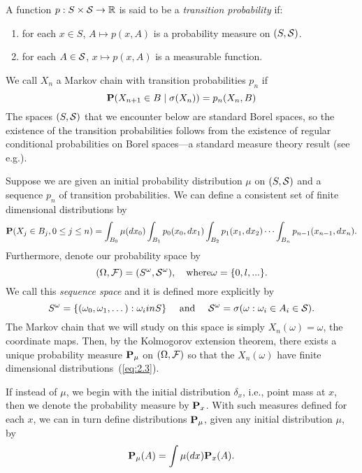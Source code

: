 \begin{definition}
A function $p : S \times \S \rightarrow \R$ is said to be a \emph{transition probability} if:
\begin{enumerate}
\item for each $x \in S$, $A \mapsto p(x, A)$ is a probability measure on $(S, \S)$.
\item for each $A \in \S$, $x \mapsto p(x, A)$ is a measurable function.
\end{enumerate}
\end{definition}
We call $X_n$ a Markov chain with transition probabilities $p_n$ if
\begin{equation}
\label{eq:2.2}
\bP(X_{n+1} \in B \mid  \sigma(X_n)) = p_n(X_n, B)
\end{equation}
The spaces $(S, \S)$ that we encounter below are standard Borel spaces, so the existence of the
transition probabilities follows from the existence of regular conditional
probabilities on Borel spaces---a standard measure theory result 
(see e.g.\cite{Durret:1996}). %

Suppose we are given an initial probability distribution $\mu$ on $(S, \S)$ and a sequence $p_n$ of
transition probabilities. We can define a consistent set of finite dimensional distributions by
\begin{equation}
\label{eq:2.3}
\bP(X_j\in B_j ,0 \leq j \leq n) = \int_{B_0} \mu(dx_0) \int_{B_1} p_0(x_0, dx_1) 
\int_{B_2} p_1(x_1, dx_2) \cdots 
\int_{B_n} p_{n-1}(x_{n-1}, dx_n).
\end{equation}
Furthermore, denote our probability space by
\[
(\Omega, \F) = (S^\omega,\S^\omega), \quad \text{where} \omega = \{0,l,...\}.
\]
We call this \emph{sequence space} and it is defined more explicitly by
\[
S^\omega  = \{(\omega_0, \omega_1, \dots) : \omega_i in S\}\quad \text{ and }
\quad
\S^\omega  = \sigma(\omega : \omega_i \in A_i \in \S).
\]
The Markov chain that we will study on this space is simply $X_n(\omega) = \omega$, the coordinate maps.
Then, by the Kolmogorov extension theorem, there exists a unique probability measure $\bP_\mu$ on
$(\Omega, \F)$ so that the $X_n(\omega)$ have finite dimensional distributions~(\ref{eq:2.3}).

If instead of $\mu$, we begin with the initial distribution $\delta_x$, i.e., point mass at $x$, then we
denote the probability measure by $\bP_x$. With such measures defined for each $x$, we can in turn
define distributions $\bP_\mu$, given any initial distribution $\mu$, by
\[
\bP_\mu(A) = \int \mu(dx)\bP_x(A).
\]

